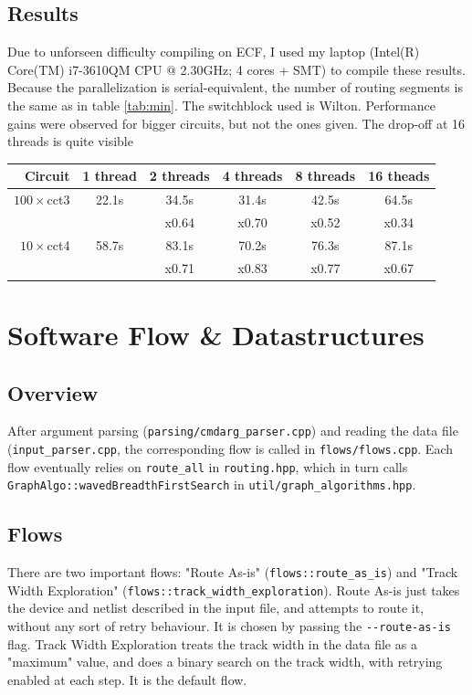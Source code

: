 \documentclass[11pt]{article}
\begin{document}
\subsection{Results}
Due to unforseen difficulty compiling on ECF, I used my laptop (Intel(R) Core(TM) i7-3610QM CPU @ 2.30GHz; 4 cores + SMT) to compile these results. Because the parallelization is serial-equivalent, the number of routing segments is the same as in table \ref{tab:min}. The switchblock used is Wilton. Performance gains were observed for bigger circuits, but not the ones given. The drop-off at 16 threads is quite visible 
\begin{table}[H]
\centering
\begin{tabular}{ r | *{5}{c} }
\hline\hline
Circuit & 1 thread & 2 threads & 4 threads & 8 threads & 16 theads \\
\hline
\( 100 \times\)cct3 & 22.1s & 34.5s & 31.4s & 42.5s & 64.5s \\
                    &       & x0.64 & x0.70 & x0.52 & x0.34 \\
\( 10 \times\)cct4 & 58.7s & 83.1s & 70.2s & 76.3s & 87.1s \\
                   &       & x0.71 & x0.83 & x0.77 & x0.67 \\
\hline\hline
\end{tabular}
\end{table} 

\section{Software Flow \& Datastructures}
\subsection{Overview}\label{sec:sw-overview}
After argument parsing (\texttt{parsing/cmdarg_parser.cpp}) and reading the data file (\texttt{input_parser.cpp}, the corresponding flow is called in \texttt{flows/flows.cpp}. Each flow eventually relies on \texttt{route_all} in \texttt{routing.hpp}, which in turn calls \texttt{GraphAlgo::wavedBreadthFirstSearch} in \texttt{util/graph_algorithms.hpp}.

\subsection{Flows}\label{sec:flows}
There are two important flows: "Route As-is" (\texttt{flows::route_as_is}) and "Track Width Exploration" (\texttt{flows::track_width_exploration}). Route As-is just takes the device and netlist described in the input file, and attempts to route it, without any sort of retry behaviour. It is chosen by passing the \verb|--route-as-is| flag. Track Width Exploration treats the track width in the data file as a "maximum" value, and does a binary search on the track width, with retrying enabled at each step. It is the default flow.
\end{document}
